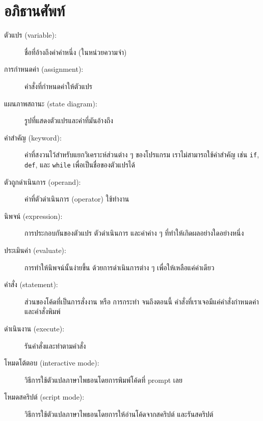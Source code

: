 \section{อภิธานศัพท์}

\begin{description}

\item[ตัวแปร (variable):]  ชื่อที่อ้างถึงค่าค่าหนึ่ง (ในหน่วยความจำ)

\item[การกำหนดค่า (assignment):]  คำสั่งที่กำหนดค่าให้ตัวแปร

\item[แผนภาพสถานะ (state diagram):]  รูปที่แสดงตัวแปรและค่าที่มันอ้างถึง

\item[คำสำคัญ (keyword):]  คำที่สงวนไว้สำหรับแยกวิเคราะห์ส่วนต่าง ๆ ของโปรแกรม 
เราไม่สามารถใช้คำสำคัญ เช่น {\tt if}, {\tt  def}, และ {\tt while} เพื่อเป็นชื่อของตัวแปรได้

\item[ตัวถูกดำเนินการ (operand):] ค่าที่ตัวดำเนินการ (operator) ใช้ทำงาน

\item[นิพจน์ (expression):]  การประกอบกันของตัวแปร ตัวดำเนินการ และค่าค่าง ๆ 
ที่ทำให้เกิดผลอย่างใดอย่างหนึ่ง

\item[ประเมินค่า (evaluate):]  การทำให้นิพจน์นั้นง่ายขึ้น ด้วยการดำเนินการต่าง ๆ 
เพื่อให้เหลือแค่ค่าเดียว

\item[คำสั่ง (statement):]  ส่วนของโค้ดที่เป็นการสั่งงาน หรือ การกระทำ จนถึงตอนนี้ 
คำสั่งที่เราเจอมีแค่คำสั่งกำหนดค่าและคำสั่งพิมพ์

\item[ดำเนินงาน (execute):]  รันคำสั่งและทำตามคำสั่ง

\item[โหมดโต้ตอบ (interactive mode):] วิธีการใช้ตัวแปลภาษาไพธอนโดยการพิมพ์โค้ดที่ prompt เลย

\item[โหมดสคริปต์ (script mode):] วิธีการใช้ตัวแปลภาษาไพธอนโดยการให้อ่านโค้ดจากสคริปต์
และรันสคริปต์


\end{description}
